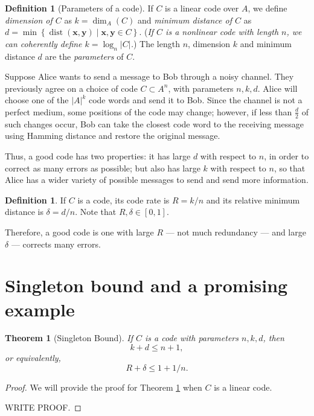 \documentclass[11pt, letterpaper]{amsart}
\newtheorem{thm}[]{Theorem}
\theoremstyle{definition}
\newtheorem{defn}[]{Definition}
\DeclareMathOperator{\dist}{dist}
\begin{document}
\begin{defn}[Parameters of a code]
    If $C$ is a linear code over $A$, we define \emph{dimension of $C$} as $k = \dim_A(C)$ and \emph{minimum distance of $C$} as $d = \min\left\{\dist(\mathbf{x}, \mathbf{y}) \mid \mathbf{x}, \mathbf{y} \in C\right\}$. (\emph{If $C$ is a nonlinear code with length $n$, we can coherently define $k = \log_n{\left|C\right|}$.}) The length $n$, dimension $k$ and minimum distance $d$ are the \emph{parameters} of $C$.
\end{defn}

Suppose Alice wants to send a message to Bob through a noisy channel. They previously agree on a choice of code $C \subset A^n$, with parameters $n, k, d$. Alice will choose one of the $|A|^k$ code words and send it to Bob. Since the channel is not a perfect medium, some positions of the code may change; however, if less than $\frac{d}{2}$ of such changes occur, Bob can take the closest code word to the receiving message using Hamming distance and restore the original message.

Thus, a good code has two properties: it has large $d$ with respect to $n$, in order to correct as many errors as possible; but also has large $k$ with respect to $n$, so that Alice has a wider variety of possible messages to send and send more information.

\begin{defn}
    If $C$ is a code, its code rate is $R = k/n$ and its relative minimum distance is $\delta = d/n$. Note that $R, \delta \in [0, 1]$.
\end{defn}

Therefore, a good code is one with large $R$ --- not much redundancy --- and large $\delta$ --- corrects many errors. 

\section{Singleton bound and a promising example} \label{s:singleton}
\begin{thm}[Singleton Bound]\label{thm:singleton_bound}
If $C$ is a code with parameters $n, k, d$, then \[k + d \le n + 1,\] or equivalently, \[R + \delta \le 1 + 1/n.\]
\end{thm}

\begin{proof}
	We will provide the proof for Theorem \ref{thm:singleton_bound} when $C$ is a linear code.
	
	WRITE PROOF.
\end{proof}
\end{document}
